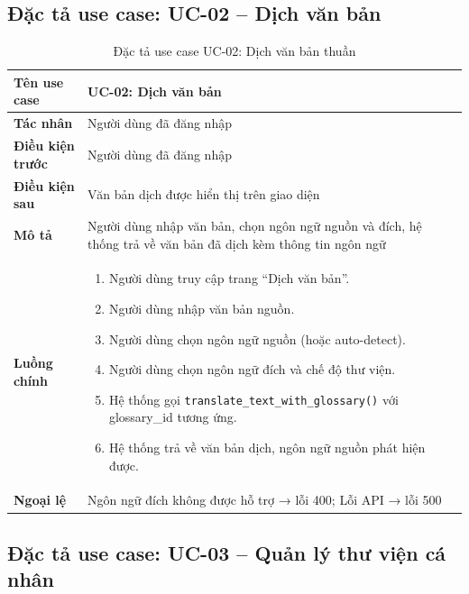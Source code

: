 \subsection{Đặc tả use case: UC-02 -- Dịch văn bản}

\begin{table}[H]
\centering
\caption{Đặc tả use case UC-02: Dịch văn bản thuần}
\label{tab:uc02}
\renewcommand{\arraystretch}{1.3}
\begin{tabularx}{\textwidth}{|l|X|}
\hline
\textbf{Tên use case}    & UC-02: Dịch văn bản \\
\hline
\textbf{Tác nhân}        & Người dùng đã đăng nhập \\
\hline
\textbf{Điều kiện trước} & Người dùng đã đăng nhập \\
\hline
\textbf{Điều kiện sau}   & Văn bản dịch được hiển thị trên giao diện \\
\hline
\textbf{Mô tả}           & Người dùng nhập văn bản, chọn ngôn ngữ nguồn và đích, hệ thống trả
                           về văn bản đã dịch kèm thông tin ngôn ngữ \\
\hline
\textbf{Luồng chính}     &
\begin{enumerate}[leftmargin=*,nosep]
  \item Người dùng truy cập trang ``Dịch văn bản''.
  \item Người dùng nhập văn bản nguồn.
  \item Người dùng chọn ngôn ngữ nguồn (hoặc auto-detect).
  \item Người dùng chọn ngôn ngữ đích và chế độ thư viện.
  \item Hệ thống gọi \texttt{translate\_text\_with\_glossary()} với glossary\_id tương ứng.
  \item Hệ thống trả về văn bản dịch, ngôn ngữ nguồn phát hiện được.
\end{enumerate} \\
\hline
\textbf{Ngoại lệ}       & Ngôn ngữ đích không được hỗ trợ → lỗi 400; Lỗi API → lỗi 500 \\
\hline
\end{tabularx}
\end{table}

\subsection{Đặc tả use case: UC-03 -- Quản lý thư viện cá nhân}

